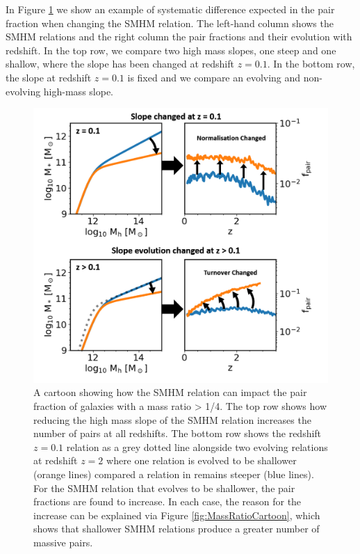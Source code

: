 In Figure \ref{fig:SMHM_PF_Cartoon} we show an example of systematic difference expected in the pair fraction when changing the SMHM relation.
The left-hand column shows the SMHM relations and the right column the pair fractions and their evolution with redshift. 
In the top row, we compare two high mass slopes, one steep and one shallow, where the slope has been changed at redshift $z = 0.1$.
In the bottom row, the slope at redshift $z = 0.1$ is fixed and we compare an evolving and non-evolving high-mass slope.

\begin{figure}[h]
    \centering
    \includegraphics[width = \linewidth]{Figures/Chapter5/SMHM_PF_Cartoon.png}
    \caption{A cartoon showing how the SMHM relation can impact the pair fraction of galaxies with a mass ratio > 1/4. The top row shows how reducing the high mass slope of the SMHM relation increases the number of pairs at all redshifts. The bottom row shows the redshift $z=0.1$ relation as a grey dotted line alongside two evolving relations at redshift $z=2$ where one relation is evolved to be shallower (orange lines) compared a relation in remains steeper (blue lines). For the SMHM relation that evolves to be shallower, the pair fractions are found to increase. In each case, the reason for the increase can be explained via Figure \ref{fig:MassRatioCartoon}, which shows that shallower SMHM relations produce a greater number of massive pairs. }
    \label{fig:SMHM_PF_Cartoon}
\end{figure}

